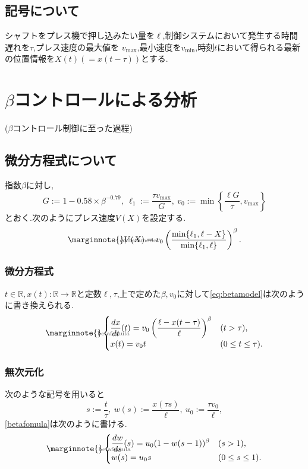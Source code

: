 \documentclass [dvipdfmx] {jsarticle}
\makeatletter
\let\temp@label\label
\def\label#1{\marginnote{\hbox to 0pt{\scriptsize \textcolor{black!60}{#1}\hss}}\temp@label{#1}\ignorespaces}
\numberwithin{equation}{section}
\theoremstyle{definition} %
\theoremstyle{definition} %
\makeatother
\begin{document}
\subsection{記号について}
シャフトをプレス機で押し込みたい量を$\ell$,制御システムにおいて発生する時間遅れを$\tau$,プレス速度の最大値を
$v_{\max}$,最小速度を$v_{\min}$,時刻$t$において得られる最新の位置情報を$X(t)(=x(t-\tau))$とする.
\section{$\beta$コントロールによる分析}
($\beta$コントロール制御に至った過程)
\subsection{微分方程式について}
指数$\beta$に対し,
\begin{equation}
    G:=1-0.58\times\beta^{-0.79},\ \ell_1:=\frac{\tau v_{\max}}{G},\ v_0:=\min\left\{\displaystyle\frac{\ell G}{\tau},v_{\max}\right\}
\end{equation}
とおく.次のようにプレス速度$V(X)$を設定する.
\begin{equation}\label{eq:betamodel}
    V(X)=v_0\left(\displaystyle\frac{\min\{\ell_1,\ell-X\}}{\min\{\ell_1,\ell\}}\right)^\beta.
\end{equation}
\subsubsection{微分方程式}
$t\in\mathbb{R},x(t):\mathbb{R}\rightarrow\mathbb{R}$と定数$\ell,\tau$,上で定めた$\beta,v_0$に対して\eqref{eq:betamodel}は次のように書き換えられる.
\begin{equation}\label{betafomula}\begin{cases}
    \displaystyle\frac{dx}{dt}(t)=v_0\left(\frac{\ell-x(t-\tau)}{\ell}\right)^\beta &(t>\tau),\\
    x(t)=v_0 t &(0\le t \le \tau).
\end{cases}\end{equation}
\subsubsection{無次元化}
次のような記号を用いると
\begin{equation}
    s:=\frac{t}{\tau},\ w(s):=\frac{x(\tau s)}{\ell},\ u_0:=\frac{\tau v_0}{\ell},
\end{equation}
\eqref{betafomula}は次のように書ける.
\begin{equation}\label{betafomula}\begin{cases}
    \displaystyle\frac{dw}{ds}(s)=u_0(1-w(s-1))^\beta &(s>1),\\
    w(s)=u_0 s &(0\le s \le 1).
\end{cases}\end{equation}
\end{document}
